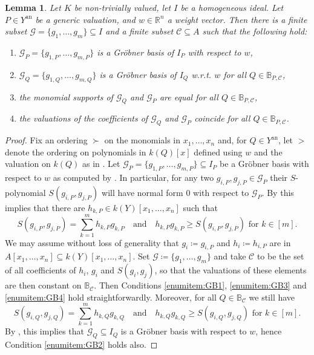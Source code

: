 \documentclass[12pt,reqno,a4paper]{amsart}
\theoremstyle{theoremstyle}
\newtheorem{lemma}[theorem]{Lemma}
\theoremstyle{examplestyle}
\theoremstyle{algorithmstyle}
\newcommand{\RR}{\mathbb{R}}
\newcommand{\an}{{\mathrm{an}}}
\begin{document}
\begin{lemma}\label{lem:GroebnerBasisStable2}
  Let $K$ be non-trivially valued, let $I$ be a homogeneous ideal. Let $P\in Y^{\mathrm{an}}$ be a generic valuation, and $w\in\RR^n$ a weight vector. Then there is a finite subset $\mathcal G=\{g_1,\dots,g_m\}\subseteq I$ and a finite subset $\mathcal{C}\subseteq A$ such that the following hold:
  \begin{enumerate}
  \item \label{enumitem:GB1} $\mathcal G_P=\{g_{1,P},\dots,g_{m,P}\}$ is a Gr\"obner basis of $I_P$ with respect to $w$,
  \item \label{enumitem:GB2} $\mathcal G_{Q}=\{g_{1,Q},\dots,g_{m,Q}\}$ is a Gr\"obner basis of $I_{Q}$ w.r.t. $w$ for all $Q\in \mathbb{B}_{P,\mathcal{C}}$,
  \item \label{enumitem:GB3} the monomial supports of $\mathcal G_{Q}$ and $\mathcal G_P$ are equal for all $Q\in \mathbb{B}_{P,\mathcal{C}}$,
  \item \label{enumitem:GB4} the valuations of the coefficients of $\mathcal{G}_{Q}$ and $\mathcal G_P$ coincide for all $Q\in \mathbb{B}_{P,\mathcal{C}}$.
  \end{enumerate}
\end{lemma}
\begin{proof}
  Fix an ordering $\succ$ on the monomials in $x_{1},\dots,x_{n}$ and, for $Q\in Y^\an$, let $>$ denote the ordering on polynomials in $k(Q)[x]$ defined using $w$ and the valuation on $k(Q)$ as in \cite[Definition~2.3]{ChanMaclagan2019}.  Let $\mathcal{G}_{P}=\{g_{1,P},\dots,g_{m,P}\}\subseteq I_{P}$ be a Gr\"{o}bner basis with respect to $w$ as computed by \cite[Algorithm 2.9]{ChanMaclagan2019}. In particular, for any two $g_{i,P},g_{j,P}\in \mathcal G_P$ their $S$-polynomial $S(g_{i,P},g_{j,P})$ will have normal form $0$ with respect to $\mathcal G_P$.  By \cite[Algorithm 2.4]{ChanMaclagan2019} this implies that there are $h_{k,P}\in k(Y)[x_1,\dots,x_n]$ such that
  \begin{equation*}
    S(g_{i,P},g_{j,P})=\sum_{k=1}^m h_{k,P}g_{k,P} \quad\text{and}\quad h_{k,P}g_{k,P}\geq{S(g_{i,P},g_{j,P})} \text{ for } k\in[m].
  \end{equation*}
  We may assume without loss of generality that $g_i\coloneqq g_{i,P}$ and $h_i\coloneqq h_{i,P}$ are in $A[x_1,\dots,x_n]\subseteq k(Y)[x_1,\dots,x_n]$. Set $\mathcal G\coloneqq \{g_1,\dots,g_m\}$ and take $\mathcal{C}$ to be the set of all coefficients of $h_{i}$, $g_{i}$ and $S(g_{i},g_{j})$, so that the valuations of these elements are then constant on $\mathbb{B}_{\mathcal{C}}$. Then Conditions \eqref{enumitem:GB1}, \eqref{enumitem:GB3} and \eqref{enumitem:GB4} hold straightforwardly.
  Moreover, for all $Q\in{\mathbb{B}_{\mathcal{C}}}$ we still have
  \begin{equation*}
    S(g_{i,Q},g_{j,Q})=\sum_{k=1}^m h_{k,Q}g_{k,Q} \quad\text{and}\quad h_{k,Q}g_{k,Q}\geq{S(g_{i,Q},g_{j,Q})} \text{ for } k\in[m].
  \end{equation*}
  By \cite[Algorithm 2.9]{ChanMaclagan2019}, this implies that $\mathcal{G}_{Q}\subseteq I_Q$ is a Gr\"{o}bner basis with respect to $w$, hence Condition \eqref{enumitem:GB2} holds also.
\end{proof}
\end{document}

